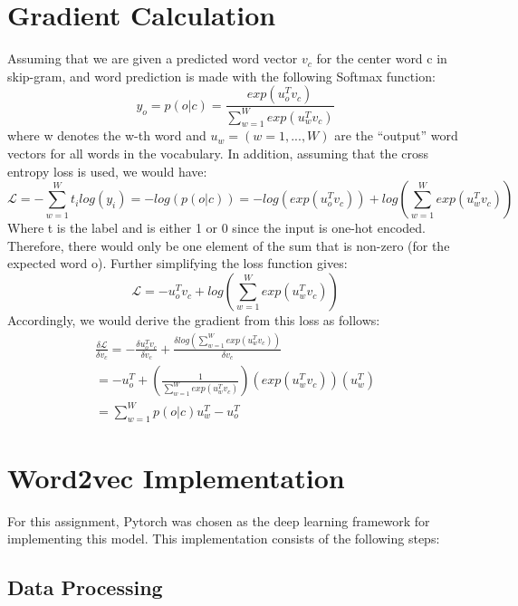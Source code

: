 \documentclass[12pt,a4paper]{article}
\begin{document}
	\section{Gradient Calculation}
	Assuming that we are given a predicted word vector $v_c$ for the center
word c in skip-gram, and word prediction is made with the following Softmax function:
	\begin{equation}
		y_o = p(o|c) = \frac{exp(u^T_ov_c)}{\sum_{w=1}^{W}exp(u^T_wv_c)}
	\end{equation}
	where w denotes the w-th word and $u_w= (w = 1, ..., W)$ are the “output” word
vectors for all words in the vocabulary. In addition, assuming that the cross entropy loss is used, we would have:
	\begin{equation}
		\mathcal{L} = - \sum_{w=1}^{W} t_i log(y_i) = - log(p(o|c)) = - log (exp(u^T_ov_c)) + log (\sum_{w=1}^{W}exp(u^T_wv_c))
	\end{equation}
	Where t is the label and is either 1 or 0 since the input is one-hot encoded. Therefore, there would only be one element of the sum that is non-zero (for the expected word o). Further simplifying the loss function gives:
	\begin{equation}
		\mathcal{L} = - u^T_ov_c + log (\sum_{w=1}^{W}exp(u^T_wv_c))
	\end{equation}
	Accordingly, we would derive the gradient from this loss as follows:
	\begin{equation}
		\begin{aligned}
			\frac{\delta \mathcal{L}}{\delta v_c} = -\frac{\delta u^T_ov_c}{\delta v_c} + \frac{\delta log(\sum_{w=1}^{W}exp(u^T_wv_c))}{\delta v_c} \qquad \qquad
			\\
			=-u^T_o + (\frac{1}{\sum_{w=1}^{W}exp(u^T_wv_c)})(exp(u^T_wv_c))(u_w^T)\\  =  \sum_{w=1}^{W} p(o|c) u_w^T - u^T_o\qquad \qquad\qquad \qquad \qquad
		\end{aligned}
	\end{equation}
	
	\section{Word2vec Implementation}
	For this assignment, Pytorch was chosen as the deep learning framework for implementing this model. This implementation consists of the following steps:
	\subsection{Data Processing}
\end{document}
